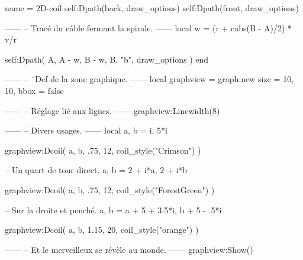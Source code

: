 \documentclass[varwidth]{standalone}
\begin{document}
\begin{luadraw}{name = 2D-coil}
  self:Dpath(back, draw_options)
  self:Dpath(front, draw_options)

------
-- Tracé du câble fermant la spirale.
------
  local w = (r + cabs(B - A)/2) * v/r

  self:Dpath(
    {A, A - w, B - w, B, "b"},
    draw_options
  )
end

------
-- ¨Def de la zone graphique.
------
local graphview = graph:new{
  size = {10, 10},
  bbox = false
}

------
-- Réglage lié aux lignes.
------
graphview:Linewidth(8)

------
-- Divers usages.
------
local a, b = i, 5*i

graphview:Dcoil(
  a, b,
  .75,
  12,
  coil_style("Crimson")
)

-- Un quart de tour direct.
a, b = 2 + i*a, 2 + i*b

graphview:Dcoil(
  a, b,
  .75,
  12,
  coil_style("ForestGreen")
)

-- Sur la droite et penché.
a, b = a + 5 + 3.5*i, b + 5 - .5*i

graphview:Dcoil(
  a, b,
  1.15,
  20,
  coil_style("orange")
)

------
-- Et le merveilleux se révèle au monde.
------
graphview:Show()
\end{luadraw}
\end{document}
